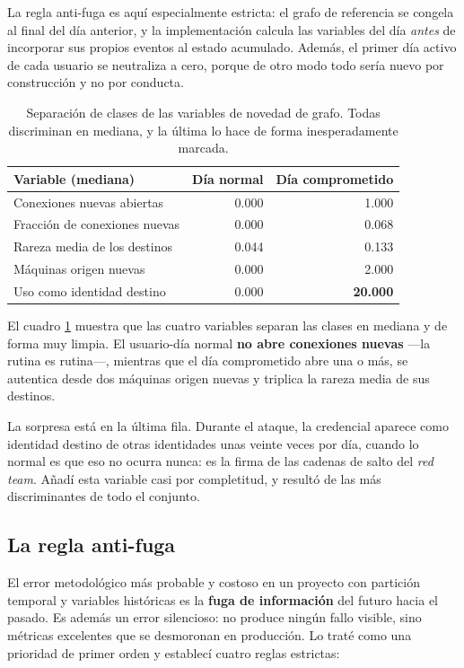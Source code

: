 \documentclass[12pt, a4paper]{article}
\begin{document}
La regla anti-fuga es aquí especialmente estricta: el grafo de referencia se congela al final del día
anterior, y la implementación calcula las variables del día \textit{antes} de incorporar sus propios
eventos al estado acumulado. Además, el primer día activo de cada usuario se neutraliza a cero,
porque de otro modo todo sería nuevo por construcción y no por conducta.

\begin{table}[!htb]
\centering
\small
\setlength{\tabcolsep}{8pt}
\begin{tabular}{lrr}
\toprule
\textbf{Variable (mediana)} & \textbf{Día normal} & \textbf{Día comprometido} \\
\midrule
Conexiones nuevas abiertas & 0.000 & 1.000 \\
Fracción de conexiones nuevas & 0.000 & 0.068 \\
Rareza media de los destinos & 0.044 & 0.133 \\
Máquinas origen nuevas & 0.000 & 2.000 \\
Uso como identidad destino & 0.000 & \textbf{20.000} \\
\bottomrule
\end{tabular}
\caption{Separación de clases de las variables de novedad de grafo. Todas discriminan en mediana, y
la última lo hace de forma inesperadamente marcada.}
\label{tab:grafo}
\end{table}

El cuadro \ref{tab:grafo} muestra que las cuatro variables separan las clases en mediana y de forma
muy limpia. El usuario-día normal \textbf{no abre conexiones nuevas} ---la rutina es rutina---,
mientras que el día comprometido abre una o más, se autentica desde dos máquinas origen nuevas y
triplica la rareza media de sus destinos.

La sorpresa está en la última fila. Durante el ataque, la credencial aparece como identidad destino
de otras identidades unas veinte veces por día, cuando lo normal es que eso no ocurra nunca: es la
firma de las cadenas de salto del \textit{red team}. Añadí esta variable casi por completitud, y
resultó de las más discriminantes de todo el conjunto.

\subsection{La regla anti-fuga}
\label{sec:antifuga}

El error metodológico más probable y costoso en un proyecto con partición temporal y variables
históricas es la \textbf{fuga de información} del futuro hacia el pasado. Es además un error
silencioso: no produce ningún fallo visible, sino métricas excelentes que se desmoronan en
producción. Lo traté como una prioridad de primer orden y establecí cuatro reglas estrictas:
\end{document}

